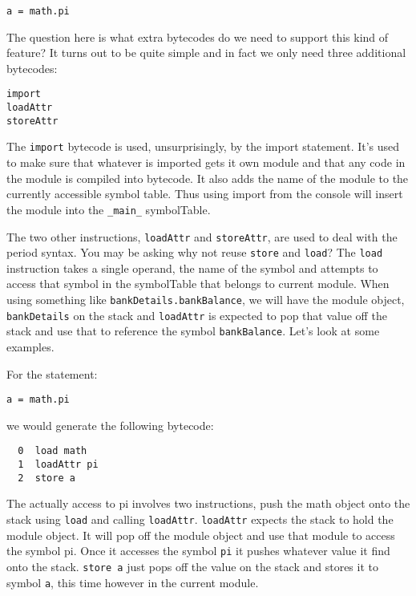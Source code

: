 \begin{lstlisting}
a = math.pi
\end{lstlisting}

The question here is what extra bytecodes do we need to support this kind of feature? It turns out to be quite simple and in fact we only need three additional bytecodes:

\begin{lstlisting}
import
loadAttr
storeAttr
\end{lstlisting}

The {\tt import} bytecode is used, unsurprisingly, by the import statement. It's used to make sure that whatever is imported gets it own module and that any code in the module is compiled into bytecode. It also adds the name of the module to the currently accessible symbol table. Thus using import from the console will insert the module into the {\tt _main_} symbolTable.

The two other instructions, {\tt loadAttr} and {\tt storeAttr}, are used to deal with the period syntax. You may be asking why not reuse {\tt store} and {\tt load}? The {\tt load} instruction takes a single operand, the name of the symbol and attempts to access that symbol in the symbolTable that belongs to current module. When using something like {\tt bankDetails.bankBalance}, we will have the module object, {\tt bankDetails} on the stack and {\tt loadAttr} is expected to pop that value off the stack and use that to reference the symbol {\tt bankBalance}. Let's look at some examples.

For the statement:

\begin{lstlisting}
a = math.pi
\end{lstlisting}

we would generate the following bytecode:

\begin{lstlisting}
  0  load math
  1  loadAttr pi
  2  store a
\end{lstlisting}

The actually access to pi involves two instructions, push the math object onto the stack using {\tt load} and calling {\tt loadAttr}. {\tt loadAttr} expects the stack to hold the module object. It will pop off the module object and use that module to access the symbol pi. Once it accesses the symbol {\tt pi} it pushes whatever value it find onto the stack. {\tt store a} just pops off the value on the stack and stores it to symbol {\tt a}, this time however in the current module.

